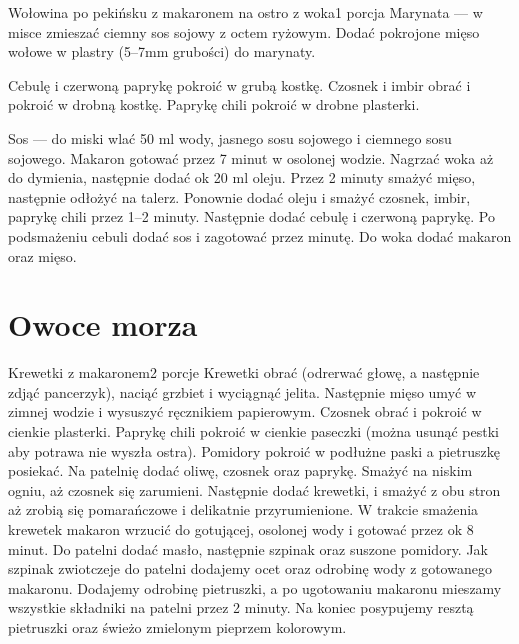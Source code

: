 \documentclass[a4paper,12pt]{article}
\begin{document}
\begin{recipe}{Wołowina po pekińsku z makaronem na ostro z woka}{1 porcja}{}
Marynata --- w misce zmieszać ciemny sos sojowy z octem ryżowym. Dodać
pokrojone mięso wołowe w plastry (5--7mm grubości) do marynaty.

Cebulę i czerwoną paprykę pokroić w grubą kostkę. Czosnek i imbir obrać i
pokroić w drobną kostkę. Paprykę chili pokroić w drobne plasterki.

Sos --- do miski wlać 50 ml wody, jasnego sosu sojowego i ciemnego sosu sojowego. 
Makaron gotować przez 7 minut w osolonej wodzie.
\freeform%
Nagrzać woka aż do dymienia, następnie dodać ok 20 ml oleju. Przez 2 minuty
smażyć mięso, następnie odłożyć na talerz. Ponownie dodać oleju i smażyć
czosnek, imbir, paprykę chili przez 1--2 minuty. Następnie dodać cebulę i
czerwoną paprykę. Po podsmażeniu cebuli dodać sos i zagotować przez minutę. Do
woka dodać makaron oraz mięso.

\end{recipe}

\newpage

\section{Owoce morza}

\begin{recipe}{Krewetki z makaronem}{2 porcje}{}
Krewetki obrać (odrerwać głowę, a następnie zdjąć pancerzyk), naciąć grzbiet i wyciągnąć jelita. Następnie mięso umyć w zimnej wodzie i wysuszyć ręcznikiem papierowym.
Czosnek obrać i pokroić w cienkie plasterki. Paprykę chili pokroić w cienkie paseczki (można usunąć pestki aby potrawa nie wyszła ostra).
Pomidory pokroić w podłużne paski a pietruszkę posiekać.
Na patelnię dodać oliwę, czosnek oraz paprykę. Smażyć na niskim ogniu, aż czosnek się zarumieni.
Następnie dodać krewetki, i smażyć z obu stron aż zrobią się pomarańczowe i delikatnie przyrumienione.
\freeform%
W trakcie smażenia krewetek makaron wrzucić do gotującej, osolonej wody i gotować przez ok 8 minut. Do patelni dodać masło, następnie szpinak oraz suszone pomidory. Jak szpinak zwiotczeje do patelni dodajemy ocet oraz odrobinę wody z gotowanego makaronu. Dodajemy odrobinę pietruszki, a po ugotowaniu makaronu mieszamy wszystkie składniki na patelni przez 2 minuty. Na koniec posypujemy resztą pietruszki oraz świeżo zmielonym pieprzem kolorowym.

\end{recipe}
\end{document}
